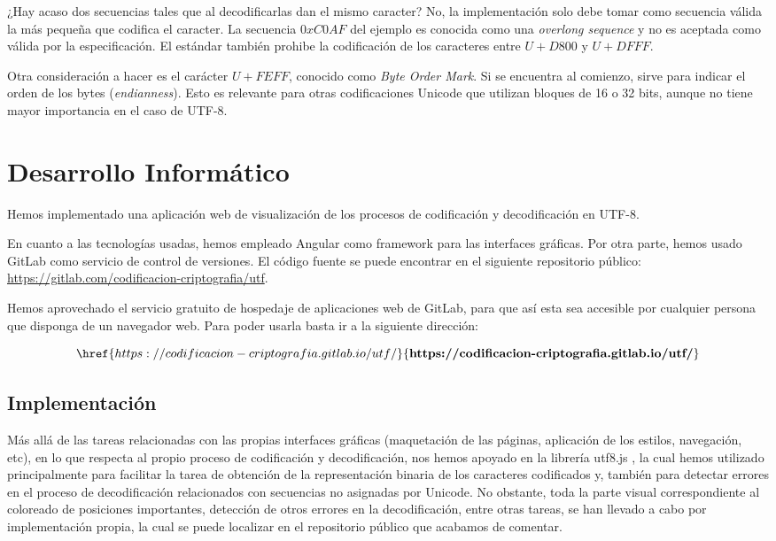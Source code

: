 \documentclass{article}
\begin{document}
¿Hay acaso dos secuencias tales que al decodificarlas dan el mismo caracter? No,
la implementación solo debe tomar como secuencia válida la más pequeña que
codifica el caracter. La secuencia $0xC0AF$ del ejemplo es conocida como una
\textit{overlong sequence} y no es aceptada como válida por la especificación.
El estándar también prohibe la codificación de los caracteres entre $U+D800$ y
$U+DFFF$.

Otra consideración a hacer es el carácter $U+FEFF$, conocido como \textit{Byte
  Order Mark}. Si se encuentra al comienzo, sirve para indicar el orden de los
bytes (\textit{endianness}). Esto es relevante para otras codificaciones Unicode
que utilizan bloques de 16 o 32 bits, aunque no tiene mayor importancia en el
caso de UTF-8.

\section{Desarrollo Informático}
Hemos implementado una aplicación web de visualización de los procesos de
codificación y decodificación en UTF-8.

En cuanto a las tecnologías usadas, hemos empleado Angular como framework para
las interfaces gráficas. Por otra parte, hemos usado GitLab como servicio de
control de versiones. El código fuente se puede encontrar en el siguiente
repositorio público:
\href{https://gitlab.com/codificacion-criptografia/utf}{https://gitlab.com/codificacion-criptografia/utf}.

Hemos aprovechado el servicio gratuito de hospedaje de aplicaciones web de
GitLab, para que así esta sea accesible por cualquier persona que disponga de un
navegador web. Para poder usarla basta ir a la siguiente dirección:

\[\href{https://codificacion-criptografia.gitlab.io/utf/}{\textbf{https://codificacion-criptografia.gitlab.io/utf/}}\]

\subsection{Implementación}
Más allá de las tareas relacionadas con las propias interfaces gráficas
(maquetación de las páginas, aplicación de los estilos, navegación, etc), en lo
que respecta al propio proceso de codificación y decodificación, nos hemos
apoyado en la librería utf8.js \cite{utf8-npm}, la cual hemos utilizado
principalmente para facilitar la tarea de obtención de la representación binaria
de los caracteres codificados y, también para detectar errores en el proceso de
decodificación relacionados con secuencias no asignadas por Unicode. No
obstante, toda la parte visual correspondiente al coloreado de posiciones
importantes, detección de otros errores en la decodificación, entre otras
tareas, se han llevado a cabo por implementación propia, la cual se puede
localizar en el repositorio público que acabamos de comentar.
\end{document}
